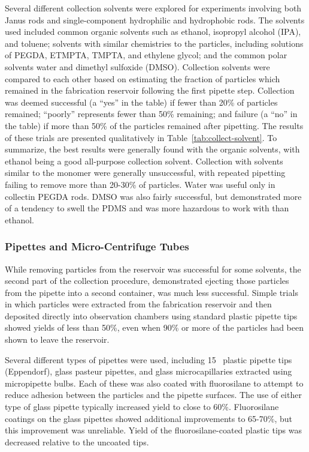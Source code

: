 Several different collection solvents were explored for experiments involving both Janus rods and single-component
hydrophilic and hydrophobic rods.  The solvents used included 
common organic solvents such as ethanol,
isopropyl alcohol (IPA), and toluene; solvents with similar chemistries to the particles, including solutions of 
PEGDA, ETMPTA, TMPTA, and ethylene glycol; and the common polar solvents water and dimethyl sulfoxide (DMSO).
Collection solvents were compared to each other based on estimating the fraction of particles which remained in the
fabrication reservoir following the first pipette step.  Collection was deemed successful (a 
``yes'' in the table) if fewer than 20\% of particles remained; ``poorly'' represents fewer than 50\% remaining; and 
failure (a ``no'' in the table) if more than 50\% of the particles remained after pipetting.
The results of these trials are presented qualitatively in Table~\ref{tab:collect-solvent}.  To summarize, the best
results were generally found with the organic solvents, with ethanol being a good all-purpose collection solvent.
Collection with solvents similar to the monomer were generally unsuccessful, with repeated pipetting failing to 
remove more than 20-30\% of particles.  Water was useful only in collectin PEGDA rods.
DMSO was also fairly successful, but demonstrated more of a tendency to swell the PDMS
and was more hazardous to work with than ethanol.

\subsubsection{Pipettes and Micro-Centrifuge Tubes}

While removing particles from the reservoir was successful for some solvents, the second part of the collection 
procedure, demonstrated ejecting those particles from the pipette into a second container, was much less successful.  
Simple trials in which particles were extracted from the fabrication reservoir and then deposited directly into 
observation chambers using standard plastic pipette tips showed yields of less than 50\%, 
even when 90\% or more of the particles had been shown to leave the reservoir.  


Several different types of pipettes were used, including 15 \uL~plastic pipette tips (Eppendorf), glass pasteur pipettes,
and
glass microcapillaries extracted using micropipette bulbs.  Each of these 
was also coated with fluorosilane to attempt to reduce adhesion between the particles and the pipette surfaces.
The use of either type of glass pipette typically increased yield to close to 60\%. Fluorosilane coatings on the glass
pipettes showed additional improvements to 65-70\%, but this improvement was unreliable.  Yield of the 
fluorosilane-coated plastic tips was decreased relative to the uncoated tips.

